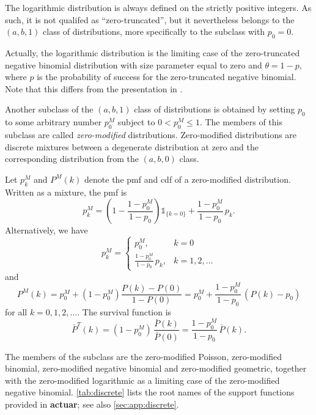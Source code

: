 \documentclass[x11names]{article}
\newcommand{\pkg}[1]{\textbf{#1}}
\begin{document}
The logarithmic distribution is always defined on the strictly
positive integers. As such, it is not qualifed as ``zero-truncated'',
but it nevertheless belongs to the $(a, b, 1)$ class of distributions,
more specifically to the subclass with $p_0 = 0$.

Actually, the logarithmic distribution is the limiting case of the
zero-truncated negative binomial distribution with size parameter
equal to zero and $\theta = 1 - p$, where $p$ is the probability of
success for the zero-truncated negative binomial. Note that this
differs from the presentation in \citet{LossModels4e}.

Another subclass of the $(a, b, 1)$ class of distributions is obtained
by setting $p_0$ to some arbitrary number $p_0^M$ subject to
$0 < p_0^M \leq 1$. The members of this subclass are called
\emph{zero-modified} distributions. Zero-modified distributions are
discrete mixtures between a degenerate distribution at zero and the
corresponding distribution from the $(a, b, 0)$ class.

Let $p_k^M$ and $P^M(k)$ denote the pmf and cdf of a zero-modified
distribution. Written as a mixture, the pmf is
\begin{equation}
  \label{eq:mixture}
  p_k^M = \left(1 - \frac{1 - p_0^M}{1 - p_0} \right) \mathbb{1}_{\{k = 0\}}
  + \frac{1 - p_0^M}{1 - p_0}\, p_k.
\end{equation}
Alternatively, we have
\begin{equation*}
  p_k^M =
  \begin{cases}
    p_0^M, & k = 0 \\
    \displaystyle\frac{1 - p_0^M}{1 - p_0}\, p_k, & k = 1, 2, \dots
  \end{cases}
\end{equation*}
and
\begin{equation*}
  P^M(k)
  = p_0^M + (1 - p_0^M) \frac{P(k) - P(0)}{1 - P(0)}
  = p_0^M + \frac{1 - p_0^M}{1 - p_0}\, (P(k) - p_0)
\end{equation*}
for all $k = 0, 1, 2, \dots$. The survival function is
\begin{equation*}
  \bar{P}^T(k)
  = (1 - p_0^M)\, \frac{\bar{P}(k)}{\bar{P}(0)}
  = \frac{1 - p_0^M}{1 - p_0}\, \bar{P}(k).
\end{equation*}

The members of the subclass are the zero-modified Poisson,
zero-modified binomial, zero-modified negative binomial and
zero-modified geometric, together with the zero-modified logarithmic
as a limiting case of the zero-modified negative binomial.
\autoref{tab:discrete} lists the root names of the support functions
provided in \pkg{actuar}; see also \autoref{sec:app:discrete}.
\end{document}
